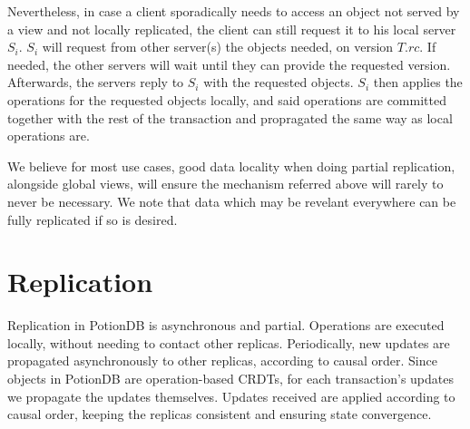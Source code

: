 \documentclass{vldb}
\begin{document}
Nevertheless, in case a client sporadically needs to access an object not served by a view and not locally replicated, the client can still request it to his local server $S_i$.
$S_i$ will request from other server(s) the objects needed, on version $T.rc$.
If needed, the other servers will wait until they can provide the requested version.
Afterwards, the servers reply to $S_i$ with the requested objects.
$S_i$ then applies the operations for the requested objects locally, and said operations are committed together with the rest of the transaction and propragated the same way as local operations are.

We believe for most use cases, good data locality when doing partial replication, alongside global views, will ensure the mechanism referred above will rarely to never be necessary.
We note that data which may be revelant everywhere can be fully replicated if so is desired.

%
%

\section{Replication}
\label{sec:replication}
Replication in PotionDB is asynchronous and partial.
Operations are executed locally, without needing to contact other replicas.
Periodically, new updates are propagated asynchronously to other replicas, according to causal order.
Since objects in PotionDB are operation-based CRDTs, for each transaction's updates we propagate the updates themselves.
Updates received are applied according to causal order, keeping the replicas consistent and ensuring state convergence.
\end{document}
